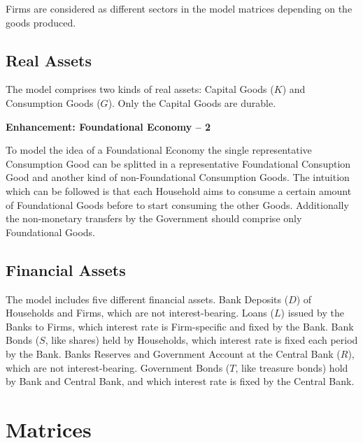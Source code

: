 \documentclass[a4paper, headings=standardclasses]{scrartcl}
\newenvironment{enh}[1][]{\begin{framed}\noindent\textbf{Enhancement: #1}\par}{\end{framed}}
\begin{document}
Firms are considered as different sectors in the model matrices depending on the goods produced.

\subsection{Real Assets}
The model comprises two kinds of real assets: Capital Goods ($K$) and Consumption Goods ($G$).
Only the Capital Goods are durable.

\begin{enh}[Foundational Economy -- 2]
	To model the idea of a Foundational Economy the single representative Consumption Good can be splitted in a representative Foundational Consuption Good and another kind of non-Foundational Consumption Goods.
	The intuition which can be followed is that each Household aims to consume a certain amount of Foundational Goods before to start consuming the other Goods. Additionally the non-monetary transfers by the Government should comprise only Foundational Goods.
\end{enh}

\subsection{Financial Assets}
The model includes five different financial assets.
Bank Deposits ($D$) of Households and Firms, which are not interest-bearing.
Loans ($L$) issued by the Banks to Firms, which interest rate is Firm-specific and fixed by the Bank.
Bank Bonds ($S$, like shares) held by Households, which interest rate is fixed each period by the Bank.
Banks Reserves and Government Account at the Central Bank ($R$), which are not interest-bearing.
Government Bonds ($T$, like treasure bonds) hold by Bank and Central Bank, and which interest rate is fixed by the Central Bank.

\section{Matrices}
\end{document}
